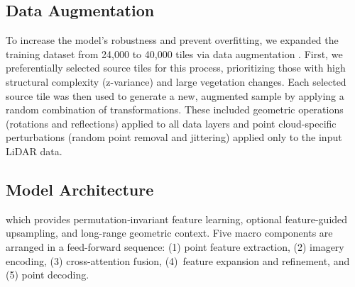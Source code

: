 \documentclass[remotesensing,article,accept,pdftex,moreauthors]{Definitions/mdpi}
\begin{document}
\subsection{Data Augmentation}
To increase the model's robustness and prevent overfitting, we expanded the training dataset from 24,000 to 40,000 tiles via data augmentation \cite{zhu2024advancements, shorten2019survey}. First, we preferentially selected source tiles for this process, prioritizing those with high structural complexity (z-variance) and large vegetation changes. Each selected source tile was then used to generate a new, augmented sample by applying a random combination of transformations. These included geometric operations (rotations and reflections) applied to all data layers and point cloud-specific perturbations (random point removal and jittering) applied only to the input LiDAR data.


\subsection{Model Architecture}
\label{sec:architecture}
 which provides permutation‐invariant feature learning, optional feature-guided upsampling, and long-range geometric context. Five macro components are arranged in a feed-forward sequence: (1) point feature extraction, (2) imagery encoding, (3) cross-attention fusion, (4)~feature expansion and refinement, and (5) point decoding.
\end{document}
